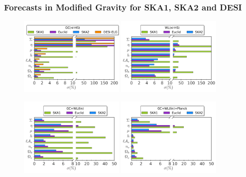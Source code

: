 \subsubsection{Forecasts in Modified Gravity for SKA1, SKA2 and DESI \label{subsub: other-surveys-late-time}}

\begin{figure}[htbp]
\begin{centering}
\includegraphics[width=0.45\textwidth]{Chapters/linear-nonlinear-MG-forecasts/figures/BarPlots/4surveys-GCnlHS-MGDE-latetime}\hspace{-0.5pt}
\includegraphics[width=0.45\textwidth]{Chapters/linear-nonlinear-MG-forecasts/figures/BarPlots/4surveys-WLnlHS-MGDE-latetime.pdf}

\includegraphics[width=0.45\textwidth]{Chapters/linear-nonlinear-MG-forecasts/figures/BarPlots/4surveys-GC+WLlin-MGDE-latetime}\hspace{-0.5pt}
\includegraphics[width=0.45\textwidth]{Chapters/linear-nonlinear-MG-forecasts/figures/BarPlots/4surveys-GC+WLlin+Planck-MGDE-latetime}


\end{centering}
\end{figure}

